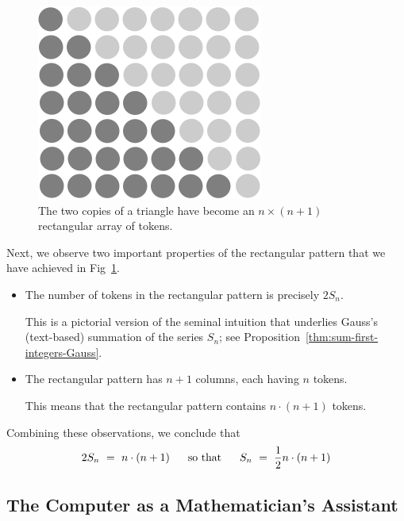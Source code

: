 \begin{figure}[ht]
\begin{center}
       \includegraphics[scale=0.35]{FiguresMaths/SumIntegersFinal}
\caption{The two copies of a triangle have become an $n \times (n+1)$
  rectangular array of tokens.}
       \label{fig:sumIntegers3}
\end{center}
\end{figure}
Next, we observe two important properties of the rectangular pattern that we have achieved in Fig~\ref{fig:sumIntegers3}.
\begin{itemize}
\item
The number of tokens in the rectangular pattern is precisely $2 S_n$.

\smallskip

This is a pictorial version of the seminal intuition that underlies Gauss's (text-based) summation of the series $S_n$; see Proposition~\ref{thm:sum-first-integers-Gauss}.

\medskip\item
The rectangular pattern has $n+1$ columns, each having $n$ tokens.

\smallskip

This means that the rectangular pattern contains $n \cdot (n+1)$ tokens.
\end{itemize}
Combining these observations, we conclude that
\[ 2 S_n \ = \ n \cdot (n+1) \ \ \ \ \mbox{ so that } \ \ \ \
S_n \ = \ {1 \over 2} n \cdot (n+1)
\]


\subsection{The Computer as a Mathematician's Assistant}

